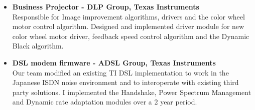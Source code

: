 \documentclass[line, 11pt]{res}
\renewenvironment{resume}{\begingroup}{\endgroup}
\begin{document}
\begin{resume}
\begin{itemize}
        \item \textbf{Business Projector - DLP Group, Texas Instruments}\\
        Responsible for Image improvement algorithms, drivers and 
        the color wheel motor control algorithm. Designed and implemented driver 
        module for new color wheel motor driver, feedback speed control algorithm 
        and the Dynamic Black algorithm. 
        
        \item \textbf{DSL modem firmware - ADSL Group, Texas Instruments}\\
        Our team modified an existing TI DSL implementation to work in the 
        Japanese ISDN noise environment and to interoperate with existing third 
        party solutions. I implemented the Handshake, Power Spectrum Management 
        and Dynamic rate adaptation modules over a 2 year period.
    \end{itemize}



    


\end{resume}
\end{document}
